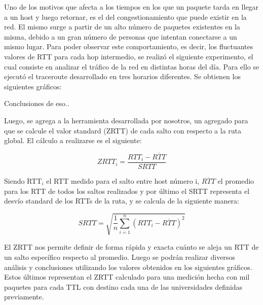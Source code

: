 Uno de los motivos que afecta a los tiempos en los que un paquete tarda en llegar a un host y luego retornar, es el del congestionamiento que puede existir en la red. El mismo surge a partir de un alto número de paquetes existentes en la misma, debido a un gran número de personas que intentan conectarse a un mismo lugar. Para poder observar este comportamiento, es decir, los fluctuantes valores de RTT para cada hop intermedio, se realizó el siguiente experimento, el cual consiste en analizar el tráfico de la red en distintas horas del día. Para ello se ejecutó el traceroute desarrollado en tres horarios diferentes. Se obtienen los siguientes gráficos:





Conclusiones de eso..

Luego, se agrega a la herramienta desarrollada por nosotros, un agregado para que se calcule el valor standard (ZRTT) de cada salto con respecto a la ruta global. El cálculo a realizarse es el siguiente:

 \begin{equation}
 	ZRTT_i = \frac{RTT_i - \overline{RTT}}{SRTT} 
 \end{equation}

 Siendo RTT$_{i}$ el RTT medido para el salto entre host número i, $\overline{RTT}$ el promedio para los RTT de todos los saltos realizados y por último el SRTT representa el desvío standard de los RTTs de la ruta, y se calcula de la siguiente manera:

\begin{equation}
 	SRTT = \sqrt{\frac{1}{n} \sum_{i=1}^{n} (RTT_i - \overline{RTT})^2}
 \end{equation}

El ZRTT nos permite definir de forma rápida y exacta cuánto se aleja un RTT de un salto específico respecto al promedio. Luego se podrán realizar diversos análisis y conclusiones utilizando los valores obtenidos en los siguientes gráficos. Estos últimos representan el ZRTT calculado para una medición hecha con mil paquetes para cada TTL con destino cada una de las universidades definidas previamente. 





